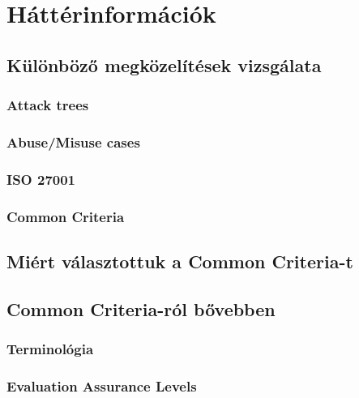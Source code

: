 \chapter{Háttérinformációk}

\section{Különböző megközelítések vizsgálata}

\subsection{Attack trees}

\subsection{Abuse/Misuse cases}

\subsection{ISO 27001}

\subsection{Common Criteria}

\section{Miért választottuk a Common Criteria-t}


\section{Common Criteria-ról bővebben}

\subsection{Terminológia}

\subsection{Evaluation Assurance Levels}

